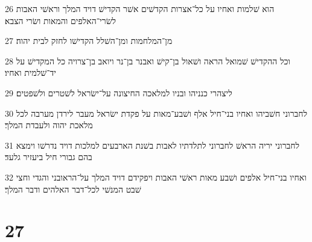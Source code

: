 \par 26 הוא שׁלמות ואחיו על כל־אצרות הקדשׁים אשׁר הקדישׁ דויד המלך וראשׁי האבות לשׂרי־האלפים והמאות ושׂרי הצבא׃
\par 27 מן־המלחמות ומן־השׁלל הקדישׁו לחזק לבית יהוה׃
\par 28 וכל ההקדישׁ שׁמואל הראה ושׁאול בן־קישׁ ואבנר בן־נר ויואב בן־צרויה כל המקדישׁ על יד־שׁלמית ואחיו׃
\par 29 ליצהרי כנניהו ובניו למלאכה החיצונה על־ישׂראל לשׁטרים ולשׁפטים׃
\par 30 לחברוני חשׁביהו ואחיו בני־חיל אלף ושׁבע־מאות על פקדת ישׂראל מעבר לירדן מערבה לכל מלאכת יהוה ולעבדת המלך׃
\par 31 לחברוני יריה הראשׁ לחברוני לתלדתיו לאבות בשׁנת הארבעים למלכות דויד נדרשׁו וימצא בהם גבורי חיל ביעזיר גלעד׃
\par 32 ואחיו בני־חיל אלפים ושׁבע מאות ראשׁי האבות ויפקידם דויד המלך על־הראובני והגדי וחצי שׁבט המנשׁי לכל־דבר האלהים ודבר המלך׃

\chapter{27}

